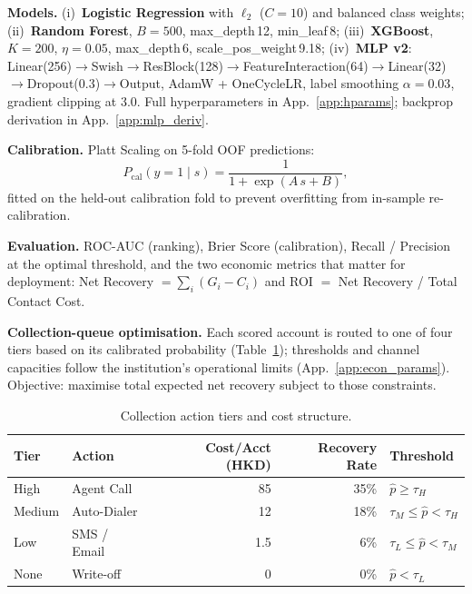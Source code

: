 \documentclass[11pt, a4paper]{article}
\begin{document}
\textbf{Models.} (i)~\textbf{Logistic Regression} with $\ell_2$ ($C\!=\!10$) and balanced class weights; (ii)~\textbf{Random Forest}, $B\!=\!500$, max\_depth\,12, min\_leaf\,8; (iii)~\textbf{XGBoost}, $K\!=\!200$, $\eta\!=\!0.05$, max\_depth\,6, scale\_pos\_weight\,9.18; (iv)~\textbf{MLP v2}: Linear(256)$\to$Swish$\to$ResBlock(128)$\to$FeatureInteraction(64)$\to$Linear(32)$\to$Dropout(0.3)$\to$Output, AdamW + OneCycleLR, label smoothing $\alpha\!=\!0.03$, gradient clipping at 3.0. Full hyperparameters in App.~\ref{app:hparams}; backprop derivation in App.~\ref{app:mlp_deriv}.

\textbf{Calibration.} Platt Scaling on 5-fold OOF predictions:
\begin{equation}\label{eq:platt}
P_{\text{cal}}(y=1\mid s)=\frac{1}{1+\exp(A\,s+B)},
\end{equation}
fitted on the held-out calibration fold to prevent overfitting from in-sample re-calibration.

\textbf{Evaluation.} ROC-AUC (ranking), Brier Score (calibration), Recall / Precision at the optimal threshold, and the two economic metrics that matter for deployment: Net Recovery $=\sum_i (G_i\!-\!C_i)$ and ROI $=$ Net Recovery / Total Contact Cost.

\textbf{Collection-queue optimisation.} Each scored account is routed to one of four tiers based on its calibrated probability (Table~\ref{tab:tiers}); thresholds and channel capacities follow the institution's operational limits (App.~\ref{app:econ_params}). Objective: maximise total expected net recovery subject to those constraints.

\begin{table}[H]
\centering
\caption{Collection action tiers and cost structure.}\label{tab:tiers}
\small
\setlength{\tabcolsep}{6pt}
\begin{tabular}{@{}llrrl@{}}
\toprule
\textbf{Tier} & \textbf{Action} & \textbf{Cost/Acct (HKD)} & \textbf{Recovery Rate} & \textbf{Threshold}\\
\midrule
High   & Agent Call    & 85 & 35\% & $\hat{p}\ge\tau_H$\\
Medium & Auto-Dialer   & 12 & 18\% & $\tau_M\le\hat{p}<\tau_H$\\
Low    & SMS / Email   & 1.5 & 6\% & $\tau_L\le\hat{p}<\tau_M$\\
None   & Write-off     & 0  & 0\%  & $\hat{p}<\tau_L$\\
\bottomrule
\end{tabular}
\end{table}
\end{document}
